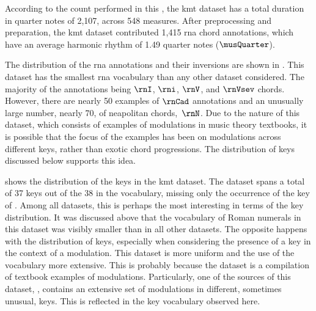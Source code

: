 
According to the count performed in this \thesisdiss{}, the
\gls{kmt} dataset has a total duration in quarter notes of
2,107, across 548 measures. After preprocessing and
preparation, the \gls{kmt} dataset contributed 1,415
\gls{rna} chord annotations, which have an average harmonic
rhythm of 1.49 quarter notes ($\musQuarter$).

The distribution of the \gls{rna} annotations and their
inversions are shown in . This
dataset has the smallest \gls{rna} vocabulary than any other
dataset considered. The majority of the annotations being
$\rnI$, $\rni$, $\rnV$, and $\rnVsev$ chords. However, there
are nearly 50 examples of $\rnCad$ annotations and an
unusually large number, nearly 70, of \gls{neapolitan}
chords,~$\rnN$. Due to the nature of this dataset, which
consists of examples of modulations in music theory
textbooks, it is possible that the focus of the examples has
been on modulations across different keys, rather than
exotic chord progressions. The distribution of keys
discussed below supports this idea.



 shows the distribution of the keys
in the \gls{kmt} dataset. The dataset spans a total of 37
keys out of the 38 in the vocabulary, missing only the
occurrence of the key of \keyBbb{}. Among all datasets, this
is perhaps the most interesting in terms of the key
distribution. It was discussed above that the vocabulary of
Roman numerals in this dataset was visibly smaller than in
all other datasets. The opposite happens with the
distribution of keys, especially when considering the
presence of a key in the context of a modulation. This
dataset is more uniform and the use of the vocabulary more
extensive. This is probably because the dataset is a
compilation of textbook examples of modulations.
Particularly, one of the sources of this dataset,
\textcite{reger1904supplement}, contains an extensive set of
modulations in different, sometimes unusual, keys. This is
reflected in the key vocabulary observed here.
